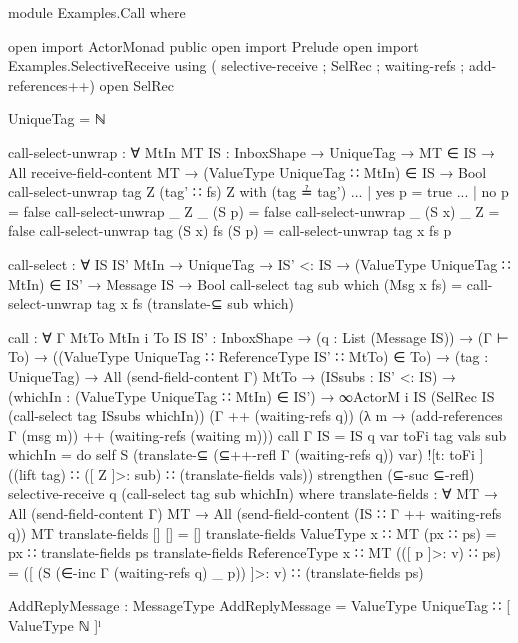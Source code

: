 \begin{code}
module Examples.Call where

open import ActorMonad public
open import Prelude
open import Examples.SelectiveReceive using (
            selective-receive ; SelRec ; waiting-refs
            ; add-references++)
open SelRec

UniqueTag = ℕ

call-select-unwrap : ∀ {MtIn MT} {IS : InboxShape} →
                     UniqueTag →
                     MT ∈ IS →
                     All receive-field-content MT →
                     (ValueType UniqueTag ∷ MtIn) ∈ IS →
                     Bool
call-select-unwrap tag Z (tag' ∷ fs) Z with (tag ≟ tag')
... | yes p = true
... | no p = false
call-select-unwrap _ Z _ (S p) = false
call-select-unwrap _ (S x) _ Z = false
call-select-unwrap tag (S x) fs (S p) = call-select-unwrap tag x fs p

call-select : ∀ {IS IS' MtIn} →
              UniqueTag →
              IS' <: IS →
              (ValueType UniqueTag ∷ MtIn) ∈ IS' →
              Message IS →
              Bool
call-select tag sub which (Msg x fs) =
  call-select-unwrap tag x fs (translate-⊆  sub which)

call : ∀ {Γ MtTo MtIn i} {To IS IS' : InboxShape} →
       (q : List (Message IS)) →
       (Γ ⊢ To) →
       ((ValueType UniqueTag ∷ ReferenceType IS' ∷ MtTo) ∈ To) →
       (tag : UniqueTag) →
       All (send-field-content Γ) MtTo →
       (ISsubs : IS' <: IS) →
       (whichIn : (ValueType UniqueTag ∷ MtIn) ∈ IS') →
       ∞ActorM i IS
         (SelRec IS (call-select tag ISsubs whichIn))
         (Γ ++ (waiting-refs q))
         (λ m → (add-references Γ (msg m)) ++ (waiting-refs (waiting m)))
call {Γ} {IS = IS} q var toFi tag vals sub whichIn = do
     self
     S (translate-⊆ (⊆++-refl Γ (waiting-refs q)) var)
       ![t: toFi ]
       ((lift tag) ∷ ([ Z ]>: sub) ∷ (translate-fields vals))
     strengthen (⊆-suc ⊆-refl)
     selective-receive q (call-select tag sub whichIn)
  where
    translate-fields : ∀ {MT} → All (send-field-content  Γ) MT →
                         All (send-field-content (IS ∷ Γ ++ waiting-refs q)) MT
    translate-fields {[]} [] = []
    translate-fields {ValueType x ∷ MT} (px ∷ ps) =
      px ∷ translate-fields ps
    translate-fields {ReferenceType x ∷ MT} (([ p ]>: v) ∷ ps) =
      ([ (S (∈-inc Γ (waiting-refs q) _ p)) ]>: v) ∷ (translate-fields ps)

AddReplyMessage : MessageType
AddReplyMessage = ValueType UniqueTag ∷ [ ValueType ℕ ]ˡ


\end{code}
